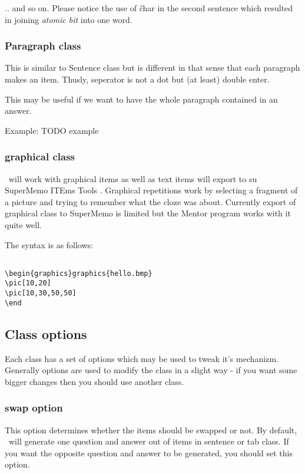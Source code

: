 \documentclass[a4paper,11pt]{article}
\newcommand{\probe}{\emph{\sc{probe{}}}}
\begin{document}
.. and so on.
Please notice the use of \^ char in the second sentence which resulted in
joining \emph{atomic bit} into one word.

\subsubsection{Paragraph class}
This is similar to Sentence class but is different in that sense that each
paragraph makes an item.
Thusly,  seperator is not a dot but (at least) double enter.


This may be useful if we want to have the whole paragraph contained in an
answer.


Example:
TODO example


\subsubsection{graphical class}
\probe\ will work with graphical items as well as text items will export to su
SuperMemo ITEms Tools .  Graphical repetitions work by selecting a fragment of
a picture and trying to remember what the cloze was about.  Currently export of
graphical class to SuperMemo is limited but the Mentor program works with it
quite well.

The syntax is as follows:

\begin{verbatim}

\begin{graphics}graphics{hello.bmp}
\pic[10,20]
\pic[10,30,50,50]
\end

\end{verbatim}
\subsection{Class options}

Each class has a set of options which may be used to tweak it's mechanizm.
Generally options are used to modify the class in a slight way - if you want
some bigger changes then you should use another class.


\subsubsection{swap option}

This option determines whether the items should be swapped or not. By default,
\probe\ will generate one question and answer out of items in sentence or tab
class.  If you want the opposite question and answer to be generated, you
should set this option.
\end{document}
